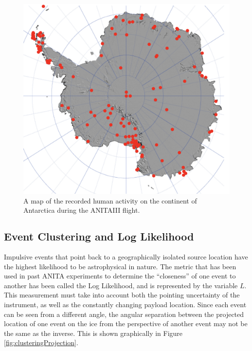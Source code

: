 \begin{figure}
	\includegraphics[width=\textwidth]{figures/BaseMap}
	\caption{A map of the recorded human activity on the continent of Antarctica during the ANITAIII flight.}
	\label{fig:BaseMap}
\end{figure}	
	
	
	\subsection{Event Clustering and Log Likelihood}
		Impulsive events that point back to a geographically isolated source location have the highest likelihood to be astrophysical in nature.  The metric that has been used in past ANITA experiments to determine the ``closeness'' of one event to another has been called the Log Likelihood, and is represented by the variable $L$.  This measurement must take into account both the pointing uncertainty of the instrument, as well as the constantly changing payload location.  Since each event can be seen from a different angle, the angular separation between the projected location of one event on the ice from the perspective of another event may not be the same as the inverse.  This is shown graphically in Figure \ref{fig:clusteringProjection}.  


